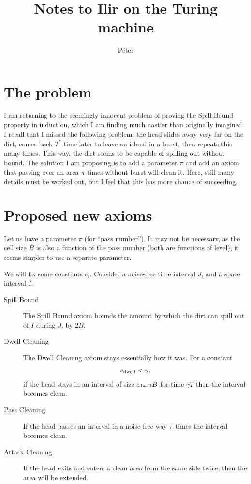 \documentclass[12pt]{memoir}
\def\B{B}
\newcommand{\Tu}{T}
\newcommand{\Cns}[2]{#1_{\textrm{\upshape #2}}}
\newcommand{\cns}[1]{\Cns{c}{#1}}
\newcommand{\cDwell}{\cns{dwell}}
\begin{document}
\title{Notes to Ilir on the Turing machine}

\author{P\'eter}

\maketitle

\section{The problem}

I am returning to the seemingly innocent problem of proving the Spill Bound property
in induction, which I am finding much nastier than originally imagined.
I recall that I missed the following problem: 
the head slides away very far on the dirt, 
comes back \( \Tu^{*} \) time later to leave an island in a burst, 
then repeats this many times.
This way, the dirt seems to be capable of spilling out without bound.
The solution I am proposing is to add a parameter \( \pi \)
and add an axiom that passing over an area \( \pi \) times without burst will clean it.
Here, still many details must be worked out, but I feel that this has more chance of succeeding.

\section{Proposed new axioms}

Let us have a parameter \( \pi \) (for ``pass number'').
It may not be necessary, as the cell size \( \B \) is also a function of the pass number
(both are functions of level), it seems simpler to use a separate parameter.

We will fix some  constants \( c_{i} \).
Consider a noise-free time interval \( J \), and a space interval \( I \).

\begin{description}
\item[Spill Bound] 
The Spill Bound axiom bounds the amount by which the dirt can spill out
of \( I \) during \( J \), by \( 2\B \).

\item[Dwell Cleaning]
The Dwell Cleaning axiom stays essentially how it was.
For a constant
\begin{align}\label{eq:cDwell}
 \cDwell < \gamma,
 \end{align}
 if the head stays in an interval of size \( \cDwell\B \) for time \( \gamma\Tu \)
then the interval becomes clean.

\item[Pass Cleaning]
If the head passes an interval in a noise-free way \( \pi \) times
the interval becomes clean.

\item[Attack Cleaning]
If the head exits and enters a clean area from the same side
twice, then the area will be extended.

\end{description}
\end{document}
